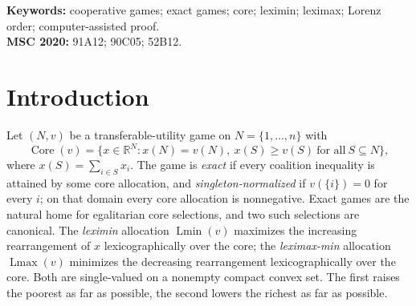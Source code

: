 \documentclass[11pt]{article}
\newcommand{\core}{\operatorname{Core}}
\newcommand{\Lmin}{\operatorname{Lmin}}
\newcommand{\Lmax}{\operatorname{Lmax}}
\begin{document}
\begin{abstract}
seven-player control refutes selection of the full maximum-overlap root block
and forces a labelled tight-support enlargement, locating the remaining gap
in staged transport congestion or a marked-facet alternative.
Finally, for sparse selector fidelity, an exact six-player example disproves
certificate-blind obstruction graphs: three complete Lmin certificates for
the same game and selector pair produce three different cover-fidelity
patterns.  Quotienting certificates by their staged tangent cones yields a
finite rational fan-supported selector stratification.  On every such fiber,
the full staged descent sets give a dimension-free potential: a one-way
cover edge strictly reverses descent-set inclusion, so every directed cover
cycle contains a reciprocal pair.  Within the qualifying top-cover
framework, every universal sparse-cover failure consequently has either a
common forbidden direction with an outside-union blocker, or a reciprocal
two-cover obstruction.  This is a canonical
mechanism decomposition, not a claim that all coalition supports are minors
of two displayed incidence configurations.  Indeed restriction, contraction,
parallel removal, amalgamation, and selector-zero deletion all fail as
universal failure-preserving player minors; only relabeling survives among
these literal schemata, and the all-dimensional non-null family is then an
infinite antichain.  Exact six-player witnesses also disprove literal
uniqueness of the displayed primitive in each mechanism branch.
\end{abstract}

\noindent\textbf{Keywords:} cooperative games; exact games; core;
leximin; leximax; Lorenz order; computer-assisted proof.\\
\textbf{MSC 2020:} 91A12; 90C05; 52B12.

\section{Introduction}

Let $(N,v)$ be a transferable-utility game on $N=\{1,\dots,n\}$ with
\[
 \core(v)=\{x\in\mathbb R^N: x(N)=v(N),\ x(S)\ge v(S)\ \text{for all}\ S\subseteq N\},
\]
where $x(S)=\sum_{i\in S}x_i$.  The game is \emph{exact} if every coalition
inequality is attained by some core allocation, and \emph{singleton-normalized}
if $v(\{i\})=0$ for every $i$; on that domain every core allocation is
nonnegative.  Exact games are the natural home for egalitarian core
selections, and two such selections are canonical.  The \emph{leximin}
allocation $\Lmin(v)$ maximizes the increasing rearrangement of $x$
lexicographically over the core; the \emph{leximax-min} allocation
$\Lmax(v)$ minimizes the decreasing rearrangement lexicographically over the
core.  Both are single-valued on a nonempty compact convex set.  The first
raises the poorest as far as possible, the second lowers the richest as far
as possible.
\end{document}
